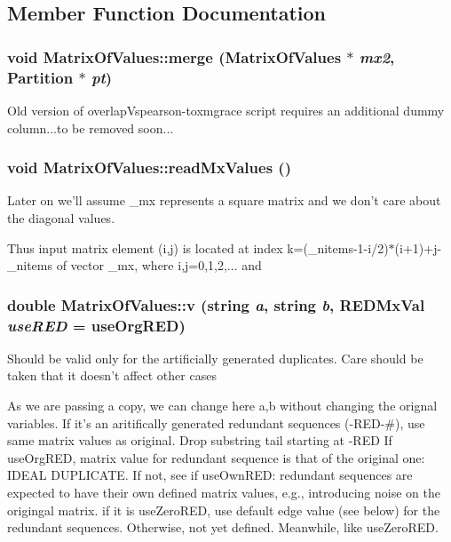 \subsection{Member Function Documentation}
\subsubsection{\setlength{\rightskip}{0pt plus 5cm}void Matrix\-Of\-Values::merge ({\bf Matrix\-Of\-Values} $\ast$ {\em mx2}, {\bf Partition} $\ast$ {\em pt})}\label{classMatrixOfValues_a8}


Old version of overlap\-Vspearson-toxmgrace script requires an additional dummy column...to be removed soon... 
\subsubsection{\setlength{\rightskip}{0pt plus 5cm}void Matrix\-Of\-Values::read\-Mx\-Values ()}\label{classMatrixOfValues_a2}


Later on we'll assume \_\-mx represents a square matrix and we don't care about the diagonal values. 

Thus input matrix element (i,j) is located at index k=(\_\-nitems-1-i/2)$\ast$(i+1)+j-\_\-nitems of vector \_\-mx, where i,j=0,1,2,... and 
\subsubsection{\setlength{\rightskip}{0pt plus 5cm}double Matrix\-Of\-Values::v (string {\em a}, string {\em b}, REDMx\-Val {\em use\-RED} = use\-Org\-RED)}\label{classMatrixOfValues_a6}


Should be valid only for the artificially generated duplicates. Care should be taken that it doesn't affect other cases

As we are passing a copy, we can change here a,b without changing the orignal variables. If it's an aritifically generated redundant sequences (-RED-\#), use same matrix values as original. Drop substring tail starting at -RED If use\-Org\-RED, matrix value for redundant sequence is that of the original one: IDEAL DUPLICATE. If not, see if use\-Own\-RED: redundant sequences are expected to have their own defined matrix values, e.g., introducing noise on the origingal matrix. if it is use\-Zero\-RED, use default edge value (see below) for the redundant sequences. Otherwise, not yet defined. Meanwhile, like use\-Zero\-RED.

